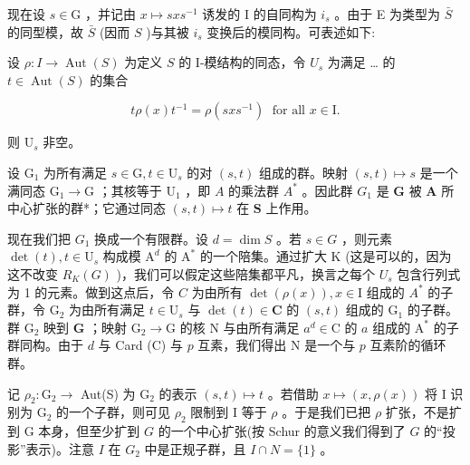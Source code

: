 \documentclass[10pt]{article}
\begin{document}
现在设 \(s \in  \mathrm{G}\) ，并记由 \(x \mapsto  {sx}{s}^{-1}\) 诱发的 I 的自同构为 \({i}_{s}\) 。由于 E 为类型为 \(\bar{S}\) 的同型模，故 \(\bar{S}\) (因而 \(S\) )与其被 \({i}_{s}\) 变换后的模同构。可表述如下:

设 \(\rho  : I \rightarrow  \operatorname{Aut}\left( S\right)\) 为定义 \(S\) 的 I-模结构的同态，令 \({U}_{s}\) 为满足 … 的 \(t \in  \operatorname{Aut}\left( S\right)\) 的集合

\[
{t\rho }\left( x\right) {t}^{-1} = \rho \left( {{sx}{s}^{-1}}\right) \;\text{ for all }x \in  \mathrm{I}.
\]

则 \({\mathrm{U}}_{s}\) 非空。

设 \({\mathrm{G}}_{1}\) 为所有满足 \(s \in  \mathrm{G},t \in  {\mathrm{U}}_{s}\) 的对 \(\left( {s,t}\right)\) 组成的群。映射 \(\left( {s,t}\right)  \mapsto  s\) 是一个满同态 \({\mathrm{G}}_{1} \rightarrow  \mathrm{G}\) ；其核等于 \({\mathrm{U}}_{1}\) ，即 \(A\) 的乘法群 \({A}^{ * }\) 。因此群 \({G}_{1}\) 是 \(\mathbf{G}\) 被 \(\mathbf{A}\) 所中心扩张的群*；它通过同态 \(\left( {s,t}\right)  \mapsto  t\) 在 \(\mathbf{S}\) 上作用。

现在我们把 \({G}_{1}\) 换成一个有限群。设 \(d = \dim S\) 。若 \(s \in  G\) ，则元素 \(\det \left( t\right) ,t \in  {\mathrm{U}}_{s}\) 构成模 \({\mathrm{A}}^{d}\) 的 \({\mathrm{A}}^{ * }\) 的一个陪集。通过扩大 \(\mathrm{K}\) (这是可以的，因为这不改变 \({R}_{K}\left( G\right)\) )，我们可以假定这些陪集都平凡，换言之每个 \({U}_{s}\) 包含行列式为 1 的元素。做到这点后，令 \(C\) 为由所有 \(\det \left( {\rho \left( x\right) }\right) ,x \in  \mathrm{I}\) 组成的 \({A}^{ * }\) 的子群，令 \({\mathrm{G}}_{2}\) 为由所有满足 \(t \in  {\mathrm{U}}_{s}\) 与 \(\det \left( t\right)  \in  \mathbf{C}\) 的 \(\left( {s,t}\right)\) 组成的 \({\mathrm{G}}_{1}\) 的子群。群 \({\mathrm{G}}_{2}\) 映到 \(\mathbf{G}\) ；映射 \({\mathrm{G}}_{2} \rightarrow  \mathrm{G}\) 的核 \(\mathrm{N}\) 与由所有满足 \({a}^{d} \in  \mathrm{C}\) 的 \(a\) 组成的 \({\mathrm{A}}^{ * }\) 的子群同构。由于 \(d\) 与 Card (C) 与 \(p\) 互素，我们得出 \(\mathrm{N}\) 是一个与 \(p\) 互素阶的循环群。

记 \({\rho }_{2} : {\mathrm{G}}_{2} \rightarrow\) Aut(S) 为 \({\mathrm{G}}_{2}\) 的表示 \(\left( {s,t}\right)  \mapsto  t\) 。若借助 \(x \mapsto  \left( {x,\rho \left( x\right) }\right)\) 将 I 识别为 \({\mathrm{G}}_{2}\) 的一个子群，则可见 \({\rho }_{2}\) 限制到 I 等于 \(\rho\) 。于是我们已把 \(\rho\) 扩张，不是扩到 \(\mathrm{G}\) 本身，但至少扩到 \(G\) 的一个中心扩张(按 Schur 的意义我们得到了 \(G\) 的“投影”表示)。注意 \(I\) 在 \({G}_{2}\) 中是正规子群，且 \(I \cap  N = \{ 1\}\) 。
\end{document}
